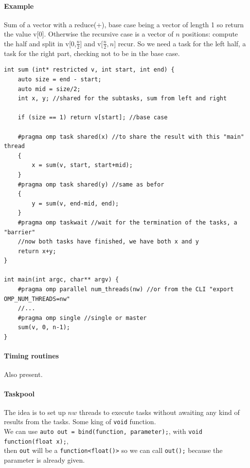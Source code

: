 \documentclass[10pt]{report}
\begin{document}
\paragraph{Example} Sum of a vector with a reduce(+), base case being a vector of length 1 so return the value v[0]. Otherwise the recursive case is a vector of $n$ positions: compute the half and split in v[0,$\frac{n}{2}$] and v[$\frac{n}{2},n$] recur. So we need a task for the left half, a task for the right part, checking not to be in the base case.
\begin{lstlisting}[style=myC]
int sum (int* restricted v, int start, int end) {
	auto size = end - start;
	auto mid = size/2;
	int x, y; //shared for the subtasks, sum from left and right
	
	if (size == 1) return v[start]; //base case
	
	#pragma omp task shared(x) //to share the result with this "main" thread
	{
		x = sum(v, start, start+mid);
	}
	#pragma omp task shared(y) //same as befor
	{
		y = sum(v, end-mid, end);
	}
	#pragma omp taskwait //wait for the termination of the tasks, a "barrier"
	//now both tasks have finished, we have both x and y
	return x+y;
}

int main(int argc, char** argv) {
	#pragma omp parallel num_threads(nw) //or from the CLI "export OMP_NUM_THREADS=nw"
	//...
	#pragma omp single //single or master
	sum(v, 0, n-1);
}
\end{lstlisting}
\paragraph{Timing routines} Also present.
\paragraph{Taskpool} The idea is to set up $nw$ threads to execute tasks without awaiting any kind of results from the tasks. Some king of \texttt{void} function.\\
We can use \texttt{auto out = bind(function, parameter);}, with \texttt{void function(float x);},\\
then \texttt{out} will be a \texttt{function<float()>} so we can call \texttt{out();} because the parameter is already given.
\end{document}
